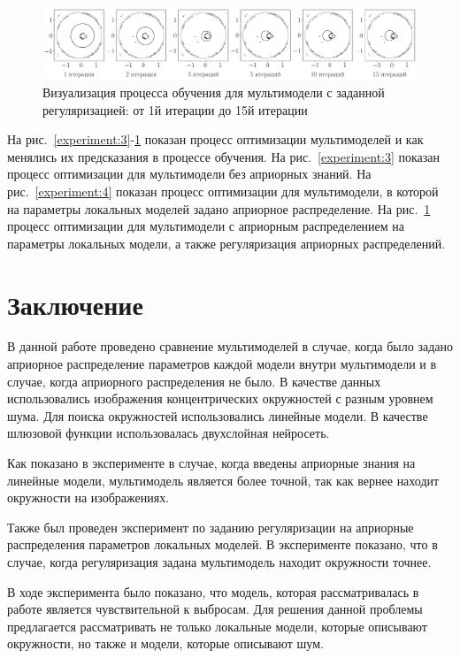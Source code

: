 \documentclass[12pt, twoside]{article}
\numberwithin{equation}{section}
\begin{document}
\begin{figure}[h!t]\center
\includegraphics[width=1\textwidth]{result/experiment_real_regular}
\caption{Визуализация процесса обучения для мультимодели с заданной регуляризацией: от 1й итерации до 15й итерации}
\label{experiment:5}
\end{figure}

На рис.~\ref{experiment:3}-\ref{experiment:5} показан процесс оптимизации мультимоделей и как менялись их предсказания в процессе обучения. На рис.~\ref{experiment:3} показан процесс оптимизации для мультимодели без априорных знаний. На рис.~\ref{experiment:4} показан процесс оптимизации для мультимодели, в которой на параметры локальных моделей задано априорное распределение. На рис.~\ref{experiment:5} процесс оптимизации для мультимодели с априорным распределением на параметры локальных модели, а также регуляризация априорных распределений.

\section{Заключение}
В данной работе проведено сравнение мультимоделей в случае, когда было задано априорное распределение параметров каждой модели внутри мультимодели и в случае, когда априорного распределения не было. В качестве данных использовались изображения концентрических окружностей с разным уровнем шума. Для поиска окружностей использовались линейные модели. В качестве шлюзовой функции использовалась двухслойная нейросеть.

Как показано в эксперименте в случае, когда введены априорные знания на линейные модели, мультимодель является более точной, так как вернее находит окружности на изображениях.

Также был проведен эксперимент по заданию регуляризации на априорные распределения параметров локальных моделей. В эксперименте показано, что в случае, когда регуляризация задана мультимодель находит окружности точнее.

В ходе эксперимента было показано, что модель, которая рассматривалась в работе является чувствительной к выбросам. Для решения данной проблемы предлагается рассматривать не только локальные модели, которые описывают окружности, но также и модели, которые описывают шум. 
\end{document}
